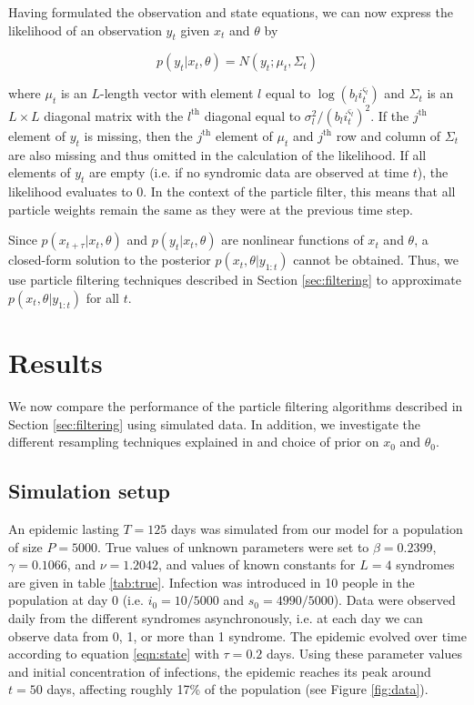 \documentclass{elsarticle}
\begin{document}
Having formulated the observation and state equations, we can now express the likelihood of an observation $y_t$ given $x_t$ and $\theta$ by

\begin{equation}
p\left(y_t\left|x_t,\theta\right.\right) = N\left(y_t;\mu_t,\Sigma_t\right) \label{eqn:lik}
\end{equation}

\noindent where $\mu_t$ is an $L$-length vector with element $l$ equal to $\log(b_li_t^{\varsigma_l})$ and $\Sigma_t$ is an $L \times L$ diagonal matrix with the $l^{\mbox{th}}$ diagonal equal to $\sigma_l^2 / (b_li_t^{\varsigma_l})^2$.  If the $j^{\mbox{th}}$ element of $y_t$ is missing, then the $j^{\mbox{th}}$ element of $\mu_t$ and $j^{\mbox{th}}$ row and column of $\Sigma_t$ are also missing and thus omitted in the calculation of the likelihood.  If all elements of $y_t$ are empty (i.e. if no syndromic data are observed at time $t$), the likelihood evaluates to 0.  In the context of the particle filter, this means that all particle weights remain the same as they were at the previous time step.

Since $p(x_{t+\tau}|x_t,\theta)$ and $p(y_t|x_t,\theta)$ are nonlinear functions of $x_t$ and $\theta$, a closed-form solution to the posterior $p(x_t,\theta|y_{1:t})$ cannot be obtained.  Thus, we use particle filtering techniques described in Section \ref{sec:filtering} to approximate $p(x_t,\theta|y_{1:t})$ for all $t$.

\section{Results} \label{sec:results}

We now compare the performance of the particle filtering algorithms described in Section \ref{sec:filtering} using simulated data.  In addition, we investigate the different resampling techniques explained in \citet{Douc:Capp:Moul:comp:2005} and choice of prior on $x_0$ and $\theta_0$.

\subsection{Simulation setup} \label{sec:sim}

An epidemic lasting $T = 125$ days was simulated from our model for a population of size $P = 5000$.  True values of unknown parameters were set to $\beta = 0.2399$, $\gamma = 0.1066$, and $\nu = 1.2042$, and values of known constants for $L = 4$ syndromes are given in table \ref{tab:true}.  Infection was introduced in 10 people in the population at day 0 (i.e. $i_0 = 10/5000$ and $s_0 = 4990/5000$).  Data were observed daily from the different syndromes asynchronously, i.e. at each day we can observe data from 0, 1, or more than 1 syndrome.  The epidemic evolved over time according to equation \eqref{eqn:state} with $\tau = 0.2$ days.  Using these parameter values and initial concentration of infections, the epidemic reaches its peak around $t = 50$ days, affecting roughly 17\% of the population (see Figure \ref{fig:data}).
\end{document}

